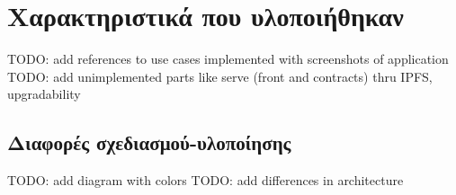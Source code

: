 \section{Χαρακτηριστικά που υλοποιήθηκαν} \label{section:4-6-implemented-parts}

TODO: add references to use cases implemented with screenshots of application
TODO: add unimplemented parts like serve (front and contracts) thru IPFS, upgradability

\subsection{Διαφορές σχεδιασμού-υλοποίησης} \label{subsection:4-6-1-design-implementation-differences}

TODO: add diagram with colors
TODO: add differences in architecture
